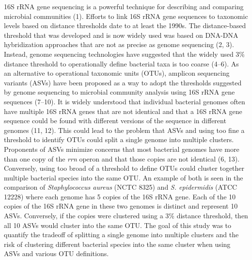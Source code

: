 \documentclass[
]{article}
\begin{document}
16S rRNA gene sequencing is a powerful technique for describing and
comparing microbial communities (1). Efforts to link 16S rRNA gene
sequences to taxonomic levels based on distance thresholds date to at
least the 1990s. The distance-based threshold that was developed and is
now widely used was based on DNA-DNA hybridization approaches that are
not as precise as genome sequencing (2, 3). Instead, genome sequencing
technologies have suggested that the widely used 3\% distance threshold
to operationally define bacterial taxa is too coarse (4--6). As an
alternative to operational taxonomic units (OTUs), amplicon sequencing
variants (ASVs) have been proposed as a way to adopt the thresholds
suggested by genome sequencing to microbial community analysis using 16S
rRNA gene sequences (7--10). It is widely understood that individual
bacterial genomes often have multiple 16S rRNA genes that are not
identical and that a 16S rRNA gene sequence could be found with
different versions of the sequence in different genomes (11, 12). This
could lead to the problem that ASVs and using too fine a threshold to
identify OTUs could split a single genome into multiple clusters.
Proponents of ASVs minimize concerns that most bacterial genomes have
more than one copy of the \emph{rrn} operon and that those copies are
not identical (6, 13). Conversely, using too broad of a threshold to
define OTUs could cluster together multiple bacterial species into the
same OTU. An example of both is seen in the comparison of
\emph{Staphylococcus aureus} (NCTC 8325) and \emph{S. epidermidis} (ATCC
12228) where each genome has 5 copies of the 16S rRNA gene. Each of the
10 copies of the 16S rRNA gene in these two genomes is distinct and
represent 10 ASVs. Conversely, if the copies were clustered using a 3\%
distance threshold, then all 10 ASVs would cluster into the same OTU.
The goal of this study was to quantify the tradeoff of splitting a
single genome into multiple clusters and the risk of clustering
different bacterial species into the same cluster when using ASVs and
various OTU definitions.
\end{document}
